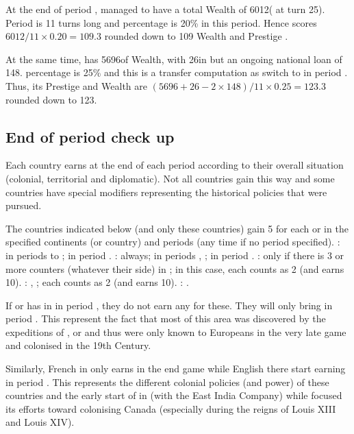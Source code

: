 \begin{exemple}
  At the end of period , \TUR managed to have a total Wealth of
  6012\ducats ( at turn 25). Period  is
  11 turns long and \TUR percentage is 20\% in this period. Hence \TUR scores
  $6012 / 11 \times 0.20 = 109.3$ rounded down to 109 Wealth and Prestige
  \VPs.

  At the same time, \VEN has 5696\ducats of Wealth, with 26\ducats in \RT but
  an ongoing national loan of 148\ducats. \VEN percentage is 25\% and this is
  a transfer computation as \VEN switch to \AUS in period . Thus,
  its Prestige and Wealth \VPs are $(5696 + 26 - 2 \times 148) / 11 \times
  0.25 = 123.3$ rounded down to 123\VPs.
\end{exemple}

\subsection{End of period check up}
\aparag Each country earns \VPs at the end of each period according to their
overall situation (colonial, territorial and diplomatic).
\bparag Not all countries gain \VPs this way and some countries have special
modifiers representing the historical policies that were pursued.

 The countries indicated below (and only
these countries) gain 5 \VPs for each \COL or \TP in the specified
continents (or country) and periods (any time if no period specified).
\bparag \ANG: \continentIndia in periods  to ;
\granderegionOceania in period .
\bparag \FRA: \continentAmerica always; \continentIndia in periods
, ; \granderegionOceania in period .
\bparag \POR: \continentAmerica only if there is 3 or more \POR \COL counters
(whatever their side) in \continentBrazil; in this case, each \COL\faceplus
counts as 2 \COL (and earns 10\VPs).
\bparag \RUS: \paysChine, \continentAmerica; each \COL\faceplus counts as 2
\COL (and earns 10\VPs).
\bparag \SUE: \continentAmerica.

\begin{designnote}
  If \ANG or \FRA has \COL in \granderegionOceania in period , they
  do not earn any \VPs for these. They will only bring \VPs in period
  . This represent the fact that most of this area was discovered
  by the expeditions of \leaderCook, \leaderBougainville or  and thus were only known to Europeans in the very late game and
  colonised in the 19th Century.

  Similarly, French \COL in \continentIndia only earns \VPs in the end game
  while English \COL there start earning \VPs in period . This
  represents the different colonial policies (and power) of these countries
  and the early start of \ANG in \continentIndia (with the East India Company)
  while \FRA focused its efforts toward colonising Canada (especially during
  the reigns of Louis XIII and Louis XIV).
\end{designnote}


